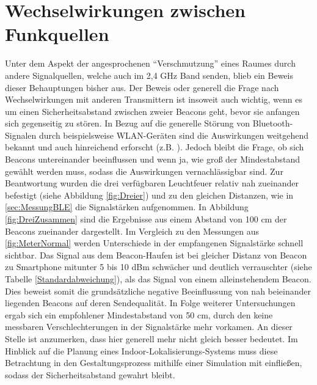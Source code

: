 \section{Wechselwirkungen zwischen Funkquellen} 
Unter dem Aspekt der angesprochenen "`Verschmutzung"' eines Raumes durch andere Signalquellen, welche auch im 2,4 GHz Band senden, blieb ein Beweis dieser Behauptungen bisher aus. Der Beweis oder generell die Frage nach Wechselwirkungen mit anderen Transmittern ist insoweit auch wichtig, wenn es um einen Sicherheitsabstand zwischen zweier Beacons geht, bevor sie anfangen sich gegenseitig zu stören. In Bezug auf die generelle Störung von Bluetooth-Signalen durch beispielsweise WLAN-Geräten sind die Auswirkungen weitgehend bekannt und auch hinreichend erforscht (z.B. \cite{InterBLEWLAN}). Jedoch bleibt die Frage, ob sich Beacons untereinander beeinflussen und wenn ja, wie groß der Mindestabstand gewählt werden muss, sodass die Auswirkungen vernachlässigbar sind. Zur Beantwortung wurden die drei verfügbaren Leuchtfeuer relativ nah zueinander befestigt (siehe Abbildung \ref{fig:Dreier}) und zu den gleichen Distanzen, wie in \ref{sec:MessungBLE} die Signalstärken aufgenommen. In Abbildung \ref{fig:DreiZusammen} sind die Ergebnisse aus einem Abstand von 100 cm der Beacons zueinander dargestellt. Im Vergleich zu den Messungen aus \ref{fig:MeterNormal} werden Unterschiede in der empfangenen Signalstärke schnell sichtbar. Das Signal aus dem Beacon-Haufen ist bei gleicher Distanz von Beacon zu Smartphone mitunter 5 bis 10 dBm schwächer und deutlich verrauschter (siehe Tabelle \ref{Standardabweichung}), als das Signal von einem alleinstehendem Beacon. Dies beweist somit die grundsätzliche negative Beeinflussung von nah beieinander liegenden Beacons auf deren Sendequalität. In Folge weiterer Untersuchungen ergab sich ein empfohlener Mindestabstand von 50 cm, durch den keine messbaren Verschlechterungen in der Signalstärke mehr vorkamen. An dieser Stelle ist anzumerken, dass hier generell mehr nicht gleich besser bedeutet. Im Hinblick auf die Planung eines Indoor-Lokalisierungs-Systems muss diese Betrachtung in den Gestaltungsprozess mithilfe einer Simulation mit einfließen, sodass der Sicherheitsabstand gewahrt bleibt.
